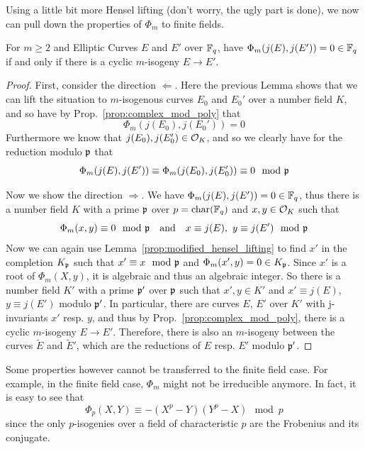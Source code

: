 Using a little bit more Hensel lifting (don't worry, the ugly part is done), we now can pull down the properties of $\Phi_m$ to finite fields.
\begin{prop}
    For $m \geq 2$ and Elliptic Curves $E$ and $E'$ over $\mathbb{F}_q$, have $\Phi_m(j(E), j(E')) = 0 \in \mathbb{F}_q$ if and only if there is a cyclic $m$-isogeny $E \to E'$.
\end{prop}
\begin{proof}
    First, consider the direction $\Leftarrow$.
    Here the previous Lemma shows that we can lift the situation to $m$-isogenous curves $E_0$ and $E_0'$ over a number field $K$, and so have by Prop.~\ref{prop:complex_mod_poly} that
    \begin{equation*}
        \Phi_m(j(E_0), j(E_0')) = 0
    \end{equation*}
    Furthermore we know that $j(E_0), j(E_0') \in \mathcal{O}_K$, and so we clearly have for the reduction modulo $\mathfrak{p}$ that
    \begin{equation*}
        \Phi_m(j(E), j(E')) \equiv \Phi_m(j(E_0), j(E_0')) \equiv 0 \mod {\mathfrak{p}}
    \end{equation*}

    Now we show the direction $\Rightarrow$.
    We have $\Phi_m(j(E), j(E')) = 0 \in \mathbb{F}_q$, thus there is a number field $K$ with a prime $\mathfrak{p}$ over $p = \mathrm{char}(\mathbb{F}_q)$ and $x, y \in \mathcal{O}_K$ such that
    \begin{equation*}
        \Phi_m(x, y) \equiv 0 \mod {\mathfrak{p}} \quad \text{and} \quad x \equiv j(E), \ y \equiv j(E') \mod {\mathfrak{p}}
    \end{equation*}
    Now we can again use Lemma~\ref{prop:modified_hensel_lifting} to find $x'$ in the completion $K_{\mathfrak{p}}$ such that $x' \equiv x \mod {\mathfrak{p}}$ and $\Phi_m(x', y) = 0 \in K_{\mathfrak{p}}$.
    Since $x'$ is a root of $\Phi_m(X, y)$, it is algebraic and thus an algebraic integer.
    So there is a number field $K'$ with a prime $\mathfrak{p}'$ over $\mathfrak{p}$ such that $x', y \in K'$ and $x' \equiv j(E)$, $y \equiv j(E')$ modulo $\mathfrak{p}'$.
    In particular, there are curves $E$, $E'$ over $K'$ with j-invariants $x'$ resp. $y$, and thus by Prop.~\ref{prop:complex_mod_poly}, there is a cyclic $m$-isogeny $E \to E'$.
    Therefore, there is also an $m$-isogeny between the curves $\tilde{E}$ and $\tilde{E}'$, which are the reductions of $E$ resp. $E'$ modulo $\mathfrak{p}'$.
\end{proof}
Some properties however cannot be transferred to the finite field case.
For example, in the finite field case, $\Phi_m$ might not be irreducible anymore.
In fact, it is easy to see that
\begin{equation*}
    \Phi_p(X, Y) \equiv -(X^p - Y)(Y^p - X) \mod p
\end{equation*}
since the only $p$-isogenies over a field of characteristic $p$ are the Frobenius and its conjugate.

